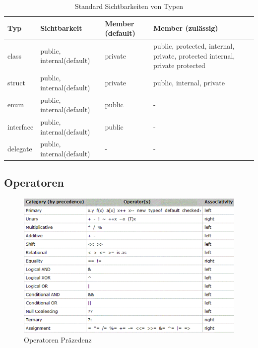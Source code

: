 \documentclass[
a4paper,
oneside,
10pt,
fleqn,
headsepline,
toc=listofnumbered, 
bibliography=totocnumbered]{scrartcl}
\begin{document}
\begin{table}[ht]
	\centering
	\begin{tabu} to \linewidth {l l l X}
		\toprule
		Typ       & Sichtbarkeit              & Member (default) & Member (zulässig)                                                           \\
		\midrule
		class     & public, internal(default) & private          & public, protected, internal, private, protected internal, private protected \\
		struct    & public, internal(default) & private          & public, internal, private                                                   \\
		enum      & public, internal(default) & public           & -                                                                           \\
		interface & public, internal(default) & public           & -                                                                           \\
		delegate  & public, internal(default) & -                & -                                                                           \\
		\bottomrule
	\end{tabu}
	\caption{Standard Sichtbarkeiten von Typen}
\end{table}

\newpage

\subsection{Operatoren}
\begin{figure}[!ht]
	\centering
	\includegraphics[width=\linewidth]{images/operator_prezedenz}
	\caption{Operatoren Präzedenz}
	\label{fig:operatorprezedenz}
\end{figure}
\end{document}
